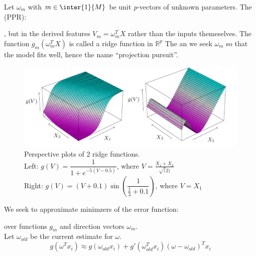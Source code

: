 Let $\omega_{m}$ with $m\in\inter{1}{M}$ be unit \emph{p}-vectors of unknown parameters.
The  (PPR):
\begin{center}
\end{center}
, but in the derived features $V_{m}=\omega_{m}^{T}X$ rather than the
inputs themeselves.
 The function $g_{m}(\omega_{m}^{T}X)$ is called a ridge
function in $\mathbb{R}^{p}$
The  an we seek $\omega_{m}$ so that the model fits well, hence the name ``projection 
pursuit''.
\begin{figure}[H]
	\begin{center}
		\includegraphics[width=\textwidth]{./chap/1chap/99sec/images/1_ridge_fct.PNG}
	\end{center}
	\caption{
	Perspective plots of 2 ridge functions.\\ Left: $g(V)=\dfrac{1}{1+e^{-5(V-0.5)}}$,
	where $V=\frac{X_{1}+X_{2}}{\sqrt(2)}$\\ Right: $g(V)=(V+0.1)\sin\left(\dfrac{1}{
	\frac{1}{3}+0.1}\right)$, where $V=X_{1}$}
	\label{fig:1_ridge_fct}
\end{figure}
We seek to approximate minimzers of the error function:
\begin{center}
\end{center}
over functions $g_{m}$ and direction vectors $\omega_{m}$.\\
Let $\omega_{old}$ be the current estimate for $\omega$.
$$ g(\omega^{T}x_{i})\approx g(\omega_{old}x_{i}) + g'(\omega_{old}^{T}x_{i})(\omega-
\omega_{old})^{T}x_{i}$$

